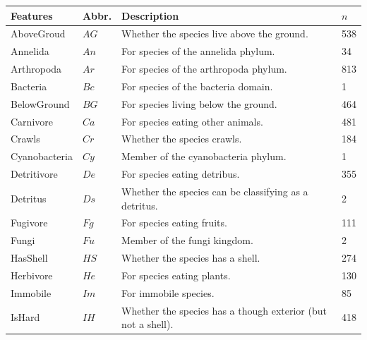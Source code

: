 \documentclass[letterpaper]{article}
\begin{document}
\begin{table}
  \centering
  \begin{tabular}{|llll|}
    \hline
    Features          & Abbr. & Description                                                       & $n$ \\
    \hline
    \hline
    AboveGroud        & $AG$   & Whether the species live above the ground.                       & 538 \\
    Annelida          & $An$   & For species of the annelida phylum.                              & 34 \\
    Arthropoda        & $Ar$   & For species of the arthropoda phylum.                            & 813 \\
    Bacteria          & $Bc$   & For species of the bacteria domain.                              & 1 \\
    BelowGround       & $BG$   & For species living below the ground.                             & 464 \\
    Carnivore         & $Ca$   & For species eating other animals.                                & 481 \\
    Crawls            & $Cr$   & Whether the species crawls.                                      & 184 \\
    Cyanobacteria     & $Cy$   & Member of the cyanobacteria phylum.                              & 1 \\
    Detritivore       & $De$   & For species eating detribus.                                     & 355 \\
    Detritus          & $Ds$   & Whether the species can be classifying as a detritus.            & 2 \\
    Fugivore          & $Fg$   & For species eating fruits.                                       & 111 \\
    Fungi             & $Fu$   & Member of the fungi kingdom.                                     & 2 \\
    HasShell          & $HS$   & Whether the species has a shell.                                 & 274 \\
    Herbivore         & $He$   & For species eating plants.                                       & 130 \\
    Immobile          & $Im$   & For immobile species.                                            & 85 \\
    IsHard            & $IH$   & Whether the species has a though exterior (but not a shell).     & 418 \\

\end{tabular}
\end{table}
\end{document}
